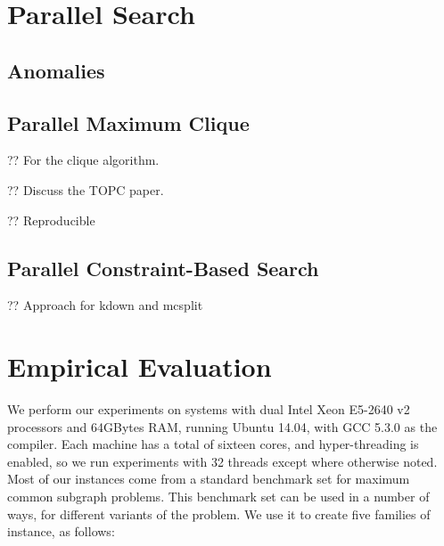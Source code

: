 \documentclass[sigconf]{acmart}
\begin{document}
\section{Parallel Search}

\subsection{Anomalies}

\subsection{Parallel Maximum Clique}

?? For the clique algorithm.

?? Discuss the TOPC paper.

?? Reproducible

\subsection{Parallel Constraint-Based Search}

?? Approach for kdown and mcsplit

\section{Empirical Evaluation}

We perform our experiments on systems with dual Intel Xeon E5-2640 v2 processors and 64GBytes RAM,
running Ubuntu 14.04, with GCC 5.3.0 as the compiler. Each machine has a total of sixteen cores, and
hyper-threading is enabled, so we run experiments with 32 threads except where otherwise noted.
Most of our instances come from a standard benchmark set
\citep{DBLP:journals/prl/SantoFSV03,DBLP:journals/jgaa/ConteFV07} for maximum common subgraph
problems.  This benchmark set can be used in a number of ways, for different variants of the
problem. We use it to create five families of instance, as follows:
\end{document}
